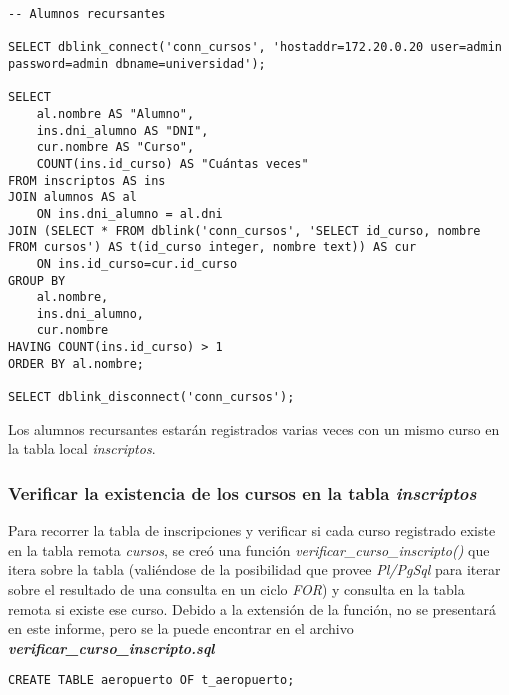 \vspace*{5mm}
\begin{lstlisting}[title=Alumnos que cursaron más de una vez una materia (el script es \emph{recursantes.sql})]
-- Alumnos recursantes

SELECT dblink_connect('conn_cursos', 'hostaddr=172.20.0.20 user=admin password=admin dbname=universidad');

SELECT 
    al.nombre AS "Alumno",
    ins.dni_alumno AS "DNI", 
    cur.nombre AS "Curso",
    COUNT(ins.id_curso) AS "Cuántas veces" 
FROM inscriptos AS ins
JOIN alumnos AS al
    ON ins.dni_alumno = al.dni
JOIN (SELECT * FROM dblink('conn_cursos', 'SELECT id_curso, nombre FROM cursos') AS t(id_curso integer, nombre text)) AS cur
    ON ins.id_curso=cur.id_curso
GROUP BY 
    al.nombre,
    ins.dni_alumno,
    cur.nombre
HAVING COUNT(ins.id_curso) > 1 
ORDER BY al.nombre;

SELECT dblink_disconnect('conn_cursos');
\end{lstlisting}

Los alumnos recursantes estarán registrados varias veces con un mismo curso en la tabla local \emph{inscriptos}. 

\subsubsection{Verificar la existencia de los cursos en la tabla \emph{inscriptos}}

Para recorrer la tabla de inscripciones y verificar si cada curso registrado existe en la tabla remota \emph{cursos}, se creó una función \emph{verificar\_curso\_inscripto()} que itera sobre la tabla (valiéndose de la posibilidad que provee \emph{Pl/PgSql} para iterar sobre el resultado de una consulta en un ciclo \emph{FOR}) y consulta en la tabla remota si existe ese curso. Debido a la extensión de la función, no se presentará en este informe, pero se la puede encontrar en el archivo \textbf{\emph{verificar\_curso\_inscripto.sql}}























\clearpage
\printbibliography




\vspace*{5mm}
\lstset{style=sql}
\begin{lstlisting}
CREATE TABLE aeropuerto OF t_aeropuerto;
\end{lstlisting}
